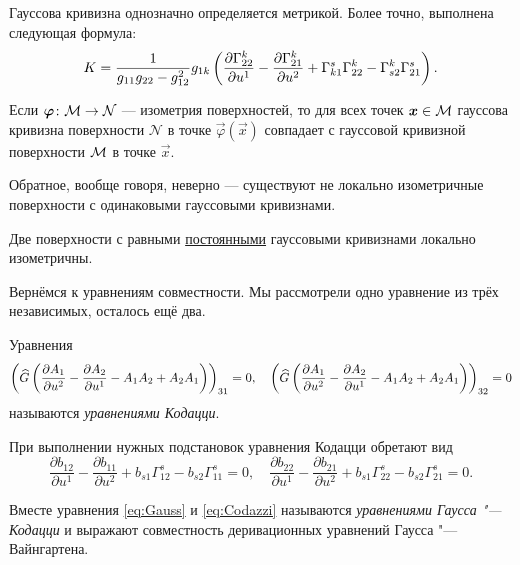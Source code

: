 \begin{theorem}[Гаусс]
	Гауссова кривизна однозначно определяется метрикой. Более точно, выполнена следующая формула:
	\[
		K = \frac{1}{g_{11}g_{22} - g_{12}^2}g_{1k}\left(\frac{\partial\Gamma^k_{22}}{\partial u^1} - \frac{\partial\Gamma_{21}^k}{\partial u^2} + \Gamma_{k1}^s\Gamma^k_{22} - \Gamma_{s2}^k\Gamma_{21}^s\right).
	\]
\end{theorem}

\begin{corollary}
	Если $\boldsymbol{\varphi}\colon \mathcal{M} \to \mathcal{N}$ --- изометрия поверхностей, то для всех точек $\boldsymbol{x} \in \mathcal{M}$ гауссова кривизна поверхности $\mathcal{N}$ в точке $\vec{\varphi}(\vec{x})$ совпадает с гауссовой кривизной поверхности $\mathcal{M}$ в точке $\vec{x}$.
\end{corollary}

Обратное, вообще говоря, неверно --- существуют не локально изометричные поверхности с одинаковыми гауссовыми кривизнами. %

\begin{problem}
	Две поверхности с равными \underline{постоянными} гауссовыми кривизнами локально изометричны.
\end{problem}

Вернёмся к уравнениям совместности. Мы рассмотрели одно уравнение из трёх независимых, осталось ещё два.

\begin{definition}
	Уравнения
	\[
		\left(\widehat{G}\left(\frac{\partial A_1}{\partial u^2} - \frac{\partial A_2}{\partial u^1} - A_1A_2 + A_2A_1\right)\right)_{31} = 0,\quad
		\left(\widehat{G}\left(\frac{\partial A_1}{\partial u^2} - \frac{\partial A_2}{\partial u^1} - A_1A_2 + A_2A_1\right)\right)_{32} = 0
	\]
	называются \textit{уравнениями Кодацци}.
\end{definition}

\noindent
При выполнении нужных подстановок уравнения Кодацци обретают вид
\begin{equation} \label{eq:Codazzi}
	\frac{\partial b_{12}}{\partial u^1} - \frac{\partial b_{11}}{\partial u^2} + b_{s1}\Gamma_{12}^s - b_{s2}\Gamma_{11}^s = 0,\quad
	\frac{\partial b_{22}}{\partial u^1} - \frac{\partial b_{21}}{\partial u^2} + b_{s1}\Gamma_{22}^s - b_{s2}\Gamma_{21}^s = 0.
\end{equation}

Вместе уравнения \eqref{eq:Gauss} и \eqref{eq:Codazzi} называются \textit{уравнениями Гаусса "---Кодацци} и выражают совместность деривационных уравнений Гаусса "---Вайнгартена.

